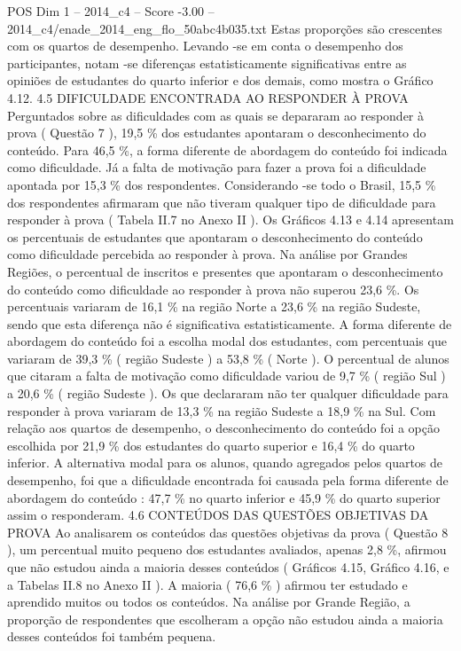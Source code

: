 \begin{textsample}{POS Dim 1 – 2014\_c4 – Score -3.00 – 2014\_c4/enade\_2014\_eng\_flo\_50abc4b035.txt}
Estas proporções são crescentes com os quartos de desempenho.
Levando -se em conta o desempenho dos participantes, notam -se diferenças estatisticamente significativas entre as opiniões de estudantes do quarto inferior e dos demais, como mostra o Gráfico 4.12. 4.5 DIFICULDADE ENCONTRADA AO RESPONDER À PROVA Perguntados sobre as dificuldades com as quais se depararam ao responder à prova ( Questão 7 ), 19,5 \% dos estudantes apontaram o desconhecimento do conteúdo.
Para 46,5 \%, a forma diferente de abordagem do conteúdo foi indicada como dificuldade.
Já a falta de motivação para fazer a prova foi a dificuldade apontada por 15,3 \% dos respondentes.
Considerando -se todo o Brasil, 15,5 \% dos respondentes afirmaram que não tiveram qualquer tipo de dificuldade para responder à prova ( Tabela II.7 no Anexo II ).
Os Gráficos 4.13 e 4.14 apresentam os percentuais de estudantes que apontaram o desconhecimento do conteúdo como dificuldade percebida ao responder à prova.
Na análise por Grandes Regiões, o percentual de inscritos e presentes que apontaram o desconhecimento do conteúdo como dificuldade ao responder à prova não superou 23,6 \%.
Os percentuais variaram de 16,1 \% na região Norte a 23,6 \% na região Sudeste, sendo que esta diferença não é significativa estatisticamente.
A forma diferente de abordagem do conteúdo foi a escolha modal dos estudantes, com percentuais que variaram de 39,3 \% ( região Sudeste ) a 53,8 \% ( Norte ).
O percentual de alunos que citaram a falta de motivação como dificuldade variou de 9,7 \% ( região Sul ) a 20,6 \% ( região Sudeste ).
Os que declararam não ter qualquer dificuldade para responder à prova variaram de 13,3 \% na região Sudeste a 18,9 \% na Sul.
Com relação aos quartos de desempenho, o desconhecimento do conteúdo foi a opção escolhida por 21,9 \% dos estudantes do quarto superior e 16,4 \% do quarto inferior.
A alternativa modal para os alunos, quando agregados pelos quartos de desempenho, foi que a dificuldade encontrada foi causada pela forma diferente de abordagem do conteúdo : 47,7 \% no quarto inferior e 45,9 \% do quarto superior assim o responderam. 4.6 CONTEÚDOS DAS QUESTÕES OBJETIVAS DA PROVA Ao analisarem os conteúdos das questões objetivas da prova ( Questão 8 ), um percentual muito pequeno dos estudantes avaliados, apenas 2,8 \%, afirmou que não estudou ainda a maioria desses conteúdos ( Gráficos 4.15, Gráfico 4.16, e a Tabelas II.8 no Anexo II ).
A maioria ( 76,6 \% ) afirmou ter estudado e aprendido muitos ou todos os conteúdos.
Na análise por Grande Região, a proporção de respondentes que escolheram a opção não estudou ainda a maioria desses conteúdos foi também pequena.

\end{textsample}
